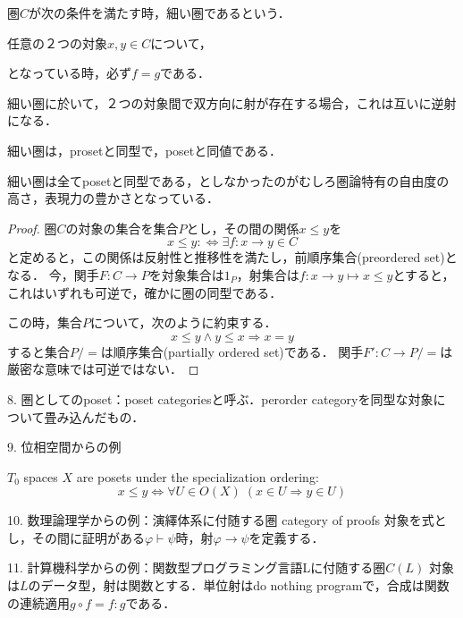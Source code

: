 \documentclass[uplatex, 12pt, dvipdfmx]{jsarticle}
\begin{document}
\begin{definition*}
    圏$C$が次の条件を満たす時，細い圏であるという．
    
    任意の２つの対象$x,y\in C$について，
    \begin{center}\end{center}
    となっている時，必ず$f=g$である．
\end{definition*}
\begin{remark*}
    細い圏に於いて，２つの対象間で双方向に射が存在する場合，これは互いに逆射になる．
\end{remark*}
\begin{proposition*}
    細い圏は，prosetと同型で，posetと同値である．
\end{proposition*}
\begin{remark}
    細い圏は全てposetと同型である，としなかったのがむしろ圏論特有の自由度の高さ，表現力の豊かさとなっている．
\end{remark}
\begin{proof}
    圏$C$の対象の集合を集合$P$とし，その間の関係$x\le y$を
    \[ x\le y:\Leftrightarrow \exists f:x\to y\in C \]
    と定めると，この関係は反射性と推移性を満たし，前順序集合(preordered set)となる．
    今，関手$F:C\to P$を対象集合は$1_P$，射集合は$f:x\to y\mapsto x\le y$とすると，これはいずれも可逆で，確かに圏の同型である．

    この時，集合$P$について，次のように約束する．
    \[ x\le y\land y\le x\Rightarrow x=y \]
    すると集合$P/=$は順序集合(partially ordered set)である．
    関手$F':C\to P/=$は厳密な意味では可逆ではない．
\end{proof}

8. 圏としてのposet：poset categoriesと呼ぶ．perorder categoryを同型な対象について畳み込んだもの．

9. 位相空間からの例
\begin{proposition*}
    $T_0$ spaces $X$ are posets under the specialization ordering:
    \[ x\le y \Leftrightarrow \forall U\in O(X)\; (x\in U\Rightarrow y\in U) \]
\end{proposition*}

10. 数理論理学からの例：演繹体系に付随する圏 category of proofs
対象を式とし，その間に証明がある$\varphi\vdash\psi$時，射$\varphi\to\psi$を定義する．

11. 計算機科学からの例：関数型プログラミング言語Lに付随する圏$C(L)$
対象は$L$のデータ型，射は関数とする．単位射はdo nothing programで，合成は関数の連続適用$g\circ f=f:g$である．
\end{document}
